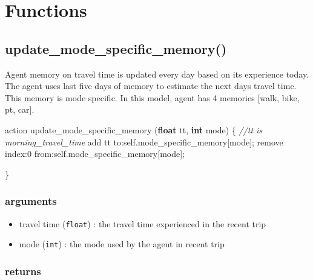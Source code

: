 \documentclass[]{book}
\newenvironment{Shaded}{\begin{snugshade}}{\end{snugshade}}
\newcommand{\CommentTok}[1]{\textcolor[rgb]{0.56,0.35,0.01}{\textit{#1}}}
\newcommand{\DecValTok}[1]{\textcolor[rgb]{0.00,0.00,0.81}{#1}}
\newcommand{\KeywordTok}[1]{\textcolor[rgb]{0.13,0.29,0.53}{\textbf{#1}}}
\newcommand{\NormalTok}[1]{#1}
\newcommand{\OtherTok}[1]{\textcolor[rgb]{0.56,0.35,0.01}{#1}}
\providecommand{\tightlist}{%
  \setlength{\itemsep}{0pt}\setlength{\parskip}{0pt}}
\theoremstyle{definition}
\theoremstyle{definition}
\theoremstyle{definition}
\theoremstyle{remark}
\begin{document}
\hypertarget{functions}{%
\chapter{Functions}\label{functions}}

\hypertarget{update_mode_specific_memory}{%
\section{update\_mode\_specific\_memory()}\label{update_mode_specific_memory}}

Agent memory on travel time is updated every day based on its experience
today. The agent uses last five days of memory to estimate the next days
travel time. This memory is mode specific. In this model, agent has 4
memories {[}walk, bike, pt, car{]}.

\begin{Shaded}
\begin{Highlighting}[]
\NormalTok{action update_mode_specific_memory }\OtherTok{(}\KeywordTok{float}\NormalTok{ tt}\OtherTok{,} \KeywordTok{int}\NormalTok{ mode}\OtherTok{)}
\NormalTok{  \{}
        \CommentTok{//tt is morning_travel_time}
\NormalTok{        add tt to:self.mode_specific_memory}\OtherTok{[}\NormalTok{mode}\OtherTok{];}
\NormalTok{        remove index:}\DecValTok{0}\NormalTok{ from:self.mode_specific_memory}\OtherTok{[}\NormalTok{mode}\OtherTok{];}
        
\NormalTok{    \}}
\end{Highlighting}
\end{Shaded}

\hypertarget{arguments}{%
\subsection*{arguments}\label{arguments}}

\begin{itemize}
\tightlist
\item
  travel time (\texttt{float}) : the travel time experienced in the
  recent trip
\item
  mode (\texttt{int}) : the mode used by the agent in recent trip
\end{itemize}

\hypertarget{returns}{%
\subsection*{returns}\label{returns}}
\end{document}
